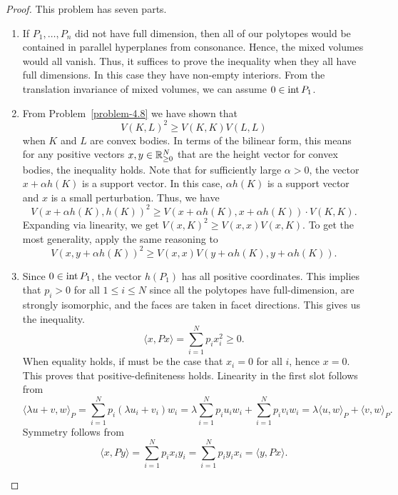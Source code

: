 \documentclass[12pt]{article}
\begin{document}
\begin{proof}
	This problem has seven parts. 
	\begin{enumerate}[label = (\alph*)]
		\item If $P_1, \ldots, P_n$ did not have full dimension, then all of our polytopes would be contained in parallel hyperplanes from consonance. Hence, the mixed volumes would all vanish. Thus, it suffices to prove the inequality when they all have full dimensions. In this case they have non-empty interiors. From the translation invariance of mixed volumes, we can assume $0 \in \operatorname{int} P_1$. 

		\item From Problem~\ref{problem-4.8} we have shown that 
		\[
			V(K, L)^2 \geq V(K, K) V(L, L)
		\]
		when $K$ and $L$ are convex bodies. In terms of the bilinear form, this means for any positive vectors $x, y \in \mathbb{R}_{\geq 0}^N$ that are the height vector for convex bodies, the inequality holds. Note that for sufficiently large $\alpha > 0$, the vector $x + \alpha h(K)$ is a support vector. In this case, $\alpha h(K)$ is a support vector and $x$ is a small perturbation. Thus, we have 
		\[
			V(x + \alpha h(K), h(K))^2 \geq V(x + \alpha h(K), x + \alpha h(K)) \cdot V(K, K).
		\]
		Expanding via linearity, we get $V(x, K)^2 \geq V(x, x) V(x, K)$. To get the most generality, apply the same reasoning to 
		\[
			V(x, y + \alpha h(K))^2 \geq V(x, x) V(y + \alpha h(K), y + \alpha h(K)). 
		\]

		\item Since $0 \in \operatorname{int} P_1$, the vector $h(P_1)$ has all positive coordinates. This implies that $p_i > 0$ for all $1 \leq i \leq N$ since all the polytopes have full-dimension, are strongly isomorphic, and the faces are taken in facet directions. This gives us the inequality. 
		\[
			\langle x, Px \rangle = \sum_{i = 1}^N p_i x_i^2 \geq 0.
		\]
		When equality holds, if must be the case that $x_i = 0$ for all $i$, hence $x = 0$. This proves that positive-definiteness holds. Linearity in the first slot follows from 
		\[
			\langle \lambda u + v, w \rangle_P = \sum_{i = 1}^N p_i(\lambda u_i + v_i) w_i = \lambda \sum_{i = 1}^N p_i u_i w_i + \sum_{i = 1}^N p_i v_i w_i = \lambda \langle u, w \rangle_P + \langle v, w \rangle_P. 
		\]
		Symmetry follows from 
		\[
			\langle x, Py \rangle = \sum_{i = 1}^N p_i x_i y_i = \sum_{i = 1}^N p_i y_i x_i = \langle y, Px \rangle. 
		\]


\end{enumerate}
\end{proof}
\end{document}
